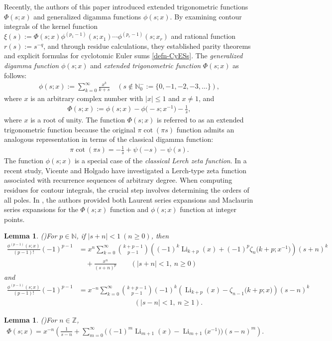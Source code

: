 \documentclass[11pt]{article}
\DeclareMathOperator{\Li}{Li}
\def\N{\mathbb{N}}
\def\Z{\mathbb{Z}}
\theoremstyle{plain}
\newtheorem{lem}[thm]{Lemma}
\theoremstyle{definition}
\begin{document}
Recently, the authors of this paper \cite{Rui-Xu2025} introduced extended trigonometric functions $\Phi(s;x)$ and generalized digamma functions $\phi(s;x)$. By examining contour integrals of the kernel function $\xi(s):=\Phi(s;x)\phi^{(p_1-1)}(s;x_1)\cdots\phi^{(p_r-1)}(s;x_r)$ and rational function $r(s):=s^{-q}$, and through residue calculations, they established parity theorems and explicit formulas for cyclotomic Euler sums \eqref{defn-CyESs}. The \emph{generalized digamma function} $\phi(s;x)$ and \emph{extended trigonometric function} $\Phi(s;x)$ as follows:
\begin{align}
\phi(s;x):=\sum_{k=0}^\infty \frac{x^k}{k+s}\quad (s\notin\N_0^-:=\{0,-1,-2,-3,\ldots\}),
\end{align}
where $x$ is an arbitrary complex number with $|x|\leq 1$ and $x\neq 1$, and
\begin{align}
\Phi(s;x):=\phi(s;x)-\phi\Big(-s;x^{-1}\Big)-\frac1{s},
\end{align}
where $x$ is a root of unity. The function $\Phi(s;x)$ is referred to as an extended trigonometric function because the original $\pi \cot(\pi s)$ function admits an analogous representation in terms of the classical digamma function:
\begin{align*}
\pi \cot(\pi s)=-\frac1{s}+\psi(-s)-\psi(s).
\end{align*}
The function $\phi(s;x)$ is a special case of the \emph{classical Lerch zeta function}. In a recent study, Vicente and Holgado \cite{VH2025} have investigated a Lerch-type zeta function associated with recurrence sequences of arbitrary degree.
When computing residues for contour integrals, the crucial step involves determining the orders of all poles. In \cite{Rui-Xu2025}, the authors provided both Laurent series expansions and Maclaurin series expansions for the $\Phi(s;x)$ function and $\phi(s;x)$ function at integer points.
\begin{lem}(\cite[Eqs. (2.4) and (2.5)]{Rui-Xu2025})\label{lem-rui-xu-one} For $p\in \N$, if $|s+n|<1\ (n\geq 0)$, then
\begin{align}\label{Lexp-phi--n-diffp-1}
\frac{\phi^{(p-1)}(s;x)}{(p-1)!} (-1)^{p-1}&=x^n\sum_{k=0}^\infty \binom{k+p-1}{p-1} \left((-1)^k \Li_{k+p}(x)+(-1)^p\zeta_n\Big(k+p;x^{-1}\Big)\right)(s+n)^k \nonumber\\&\quad+\frac{x^n}{(s+n)^p}\qquad (|s+n|<1,\ n\geq 0)
\end{align}
and
\begin{align}\label{Lexp-phi-n-diffp-1}
\frac{\phi^{(p-1)}(s;x)}{(p-1)!} (-1)^{p-1}&=x^{-n}\sum_{k=0}^\infty \binom{k+p-1}{p-1} (-1)^k  \left( \Li_{k+p}(x)-\zeta_{n-1}\Big(k+p;x\Big)\right)(s-n)^k \nonumber\\&\qquad\qquad\qquad\qquad (|s-n|<1,\ n\geq 1).
\end{align}
\end{lem}
\begin{lem}(\cite[Eq. (2.6)]{Rui-Xu2025})\label{lem-rui-xu-two} For $n\in \Z$,
\begin{align}\label{LEPhi-function}
\Phi(s;x)=x^{-n} \left(\frac1{s-n}+\sum_{m=0}^\infty \Big((-1)^m\Li_{m+1}(x)-\Li_{m+1}\Big(x^{-1}\Big)\Big)(s-n)^m \right).
\end{align}
\end{lem}
\end{document}
